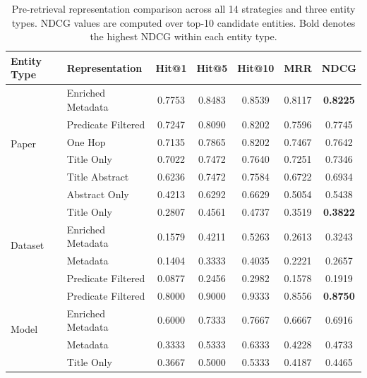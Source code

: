 \begin{table}[ht]
  \centering
  \footnotesize
  \caption{Pre-retrieval representation comparison across all 14 strategies and three entity types. NDCG values are computed over top-10 candidate entities. Bold denotes the highest NDCG within each entity type.}
  \label{tab:pre_retrieval_full_comparison}
  \begin{tabular}{llccccc}
    \toprule
    \textbf{Entity Type} & \textbf{Representation} & \textbf{Hit@1} & \textbf{Hit@5} & \textbf{Hit@10} & \textbf{MRR} & \textbf{NDCG} \\
    \midrule
    \multirow{6}{*}{Paper} & Enriched Metadata & 0.7753 & 0.8483 & 0.8539 & 0.8117 & \textbf{0.8225} \\
     & Predicate Filtered & 0.7247 & 0.8090 & 0.8202 & 0.7596 & 0.7745 \\
     & One Hop & 0.7135 & 0.7865 & 0.8202 & 0.7467 & 0.7642 \\
     & Title Only & 0.7022 & 0.7472 & 0.7640 & 0.7251 & 0.7346 \\
     & Title Abstract & 0.6236 & 0.7472 & 0.7584 & 0.6722 & 0.6934 \\
     & Abstract Only & 0.4213 & 0.6292 & 0.6629 & 0.5054 & 0.5438 \\
    \midrule
    \multirow{4}{*}{Dataset} & Title Only & 0.2807 & 0.4561 & 0.4737 & 0.3519 & \textbf{0.3822} \\
     & Enriched Metadata & 0.1579 & 0.4211 & 0.5263 & 0.2613 & 0.3243 \\
     & Metadata & 0.1404 & 0.3333 & 0.4035 & 0.2221 & 0.2657 \\
     & Predicate Filtered & 0.0877 & 0.2456 & 0.2982 & 0.1578 & 0.1919 \\
    \midrule
    \multirow{4}{*}{Model} & Predicate Filtered & 0.8000 & 0.9000 & 0.9333 & 0.8556 & \textbf{0.8750} \\
     & Enriched Metadata & 0.6000 & 0.7333 & 0.7667 & 0.6667 & 0.6916 \\
     & Metadata & 0.3333 & 0.5333 & 0.6333 & 0.4228 & 0.4733 \\
     & Title Only & 0.3667 & 0.5000 & 0.5333 & 0.4187 & 0.4465 \\
    \bottomrule
  \end{tabular}
\end{table}